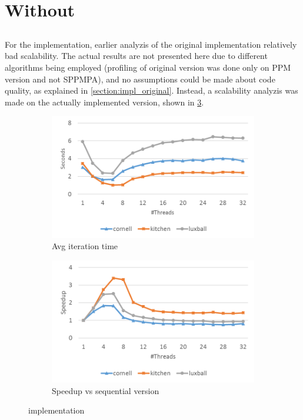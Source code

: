 \documentclass[main.tex]{subfiles}
\begin{document}
\section{Without \starpu} \label{sec:prof:cpu}

\subsection{\cpu}

For the \cpu implementation, earlier analyzis of the original implementation relatively bad scalability. The actual results are not presented here due to different algorithms being employed (profiling of original version was done only on PPM version and not SPPMPA), and no assumptions could be made about code quality, as explained in \cref{section:impl_original}.
Instead, a scalability analyzis was made on the actually implemented \cpu version, shown in \cref{fig:prof:cpu}.

\begin{figure}[!htp]
  \centering
  \begin{subfigure}{.5\textwidth}
    \centering
    \includegraphics[width=\linewidth]{profiling/cpu_time}
    \caption{Avg iteration time \label{fig:prof:cpu_time}}
  \end{subfigure}%
  \begin{subfigure}{.5\textwidth}
    \centering
    \includegraphics[width=\linewidth]{profiling/cpu_speedup}
    \caption{Speedup vs sequential version \label{fig:prof:cpu_speedup}}
  \end{subfigure}
  \caption{\cpu implementation \label{fig:prof:cpu}}
\end{figure}
\end{document}
